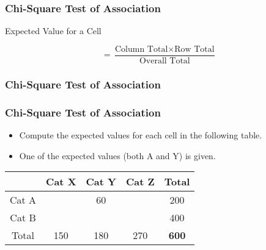 \documentclass[a4]{beamer}
\begin{document}
\begin{frame}
\frametitle{Chi-Square Test of Association}

\Large
Expected Value for a Cell

\[ = \frac{\mbox{Column Total}  \times \mbox{Row Total} } {\mbox{Overall Total}}  \]

\end{frame}
\begin{frame}
\frametitle{Chi-Square Test of Association}

\Large




\end{frame}
\begin{frame}
\frametitle{Chi-Square Test of Association}

\Large
\begin{itemize}
\item Compute the expected values for each cell in the following table.
\item One of the expected values (both A and Y) is given.
\end{itemize}
\begin{center}
\Large
\begin{tabular}{|c|c|c|c|c|}
\hline
 & Cat X & Cat Y & Cat Z & Total  \\ \hline
Cat A & & 60 &  & 200\\ \hline
Cat B & &  &  & 400 \\ \hline
Total & 150 & 180 & 270 &  \textbf{600}\\ \hline
\end{tabular} 
\end{center}

\end{frame}


\end{document}
